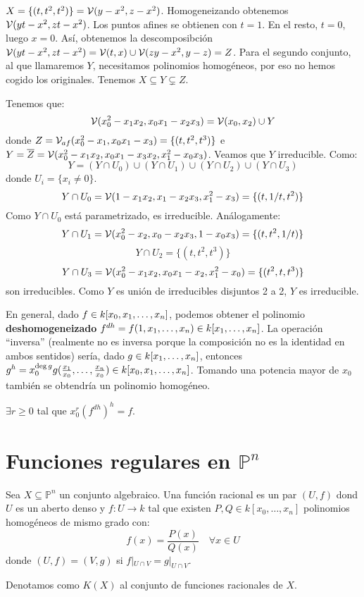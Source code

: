 \documentclass[ACGA.tex]{subfiles}
\begin{document}
\begin{ej}
$X=\{(t,t^2,t^2)\}=\mathcal{V}(y-x^2,z-x^2)$. Homogeneizando obtenemos $\mathcal{V}(yt-x^2,zt-x^2)$. Los puntos afines se obtienen con $t=1$. En el resto, $t=0$, luego $x=0$. Así, obtenemos la descomposibción $\mathcal{V}(yt-x^2,zt-x^2)=\mathcal{V}(t,x)\cup\mathcal{V}(zy-x^2,y-z)=Z$. Para el segundo conjunto, al que llamaremos $Y$, necesitamos polinomios homogéneos, por eso no hemos cogido los originales. Tenemos $X\subseteq Y\subsetneq Z$. 

Tenemos que:
\[ \mathcal{V}(x_0^2-x_1x_2, x_0x_1-x_2x_3) = \mathcal{V}(x_0,x_2) \cup Y \]
donde $Z=\mathcal{V}_{af}(x_0^2-x_1,x_0x_1-x_3) = \{(t,t^2,t^3)\}$ e $Y=\overline{Z}=\mathcal{V}(x_0^2-x_1x_2,x_0x_1-x_3x_2,x_1^2-x_0x_3)$. Veamos que $Y$ irreducible. Como:
\[ Y = (Y \cap U_0) \cup (Y \cap U_1) \cup (Y \cap U_2) \cup (Y \cap U_3) \]
donde $U_i = \{x_i \neq 0\}$.
\[ Y \cap U_0 = \mathcal{V}(1-x_1x_2,x_1-x_2x_3,x_1^2-x_3) = \{(t,1/t,t^2)\} \]
Como $Y \cap U_0$ está parametrizado, es irreducible. Análogamente:
\[ Y \cap U_1 = \mathcal{V}(x_0^2-x_2,x_0-x_2x_3,1-x_0x_3) = \{(t,t^2,1/t)\} \]
\[ Y \cap U_2 = \{(t,t^2,t^3)\} \]
\[ Y \cap U_3 = \mathcal{V}(x_0^2-x_1x_2, x_0x_1-x_2, x_1^2-x_0) = \{(t^2,t,t^3)\} \]
son irreducibles. Como $Y$ es unión de irreducibles disjuntos 2 a 2, $Y$ es irreducible.
\end{ej}

\begin{nota}
En general, dado $f\in k[x_0,x_1,\dotsc,x_{n}]$, podemos obtener el polinomio \textbf{deshomogeneizado} $f^{dh}=f(1,x_1,\dots,x_n)\in k[x_1,\dotsc,x_{n}]$. La operación ``inversa'' (realmente no es inversa porque la composición no es la identidad en ambos sentidos) sería, dado $g\in k[x_1,\dotsc,x_{n}]$, entonces $g^h=x_0^{\deg{g}}g(\frac{x_1}{x_0},\dots,\frac{x_n}{x_0})\in k[x_0,x_1,\dotsc,x_{n}]$. Tomando una potencia mayor de $x_0$ también se obtendría un polinomio homogéneo. 
\end{nota}

\begin{ejer}
$\exists r\geq 0$ tal que $x_0^r(f^{dh})^h=f$.
\end{ejer}

\section{Funciones regulares en $\mathbb{P}^n$}
\begin{defi}
Sea $X \subseteq \mathbb{P}^n$ un conjunto algebraico. Una función racional es un par $(U,f)$ dond $U$ es un aberto denso y $f : U \to k$ tal que existen $P,Q \in k[x_0,\dots,x_n]$ polinomios homogéneos de mismo grado con:
\[ f(x) = \frac{P(x)}{Q(x)} \quad \forall x \in U \]
donde $(U,f)=(V,g)$ si $f|_{U\cap V} = g|_{U\cap V}$. 

Denotamos como $K(X)$ al conjunto de funciones racionales de $X$.
\end{defi}
\end{document}
